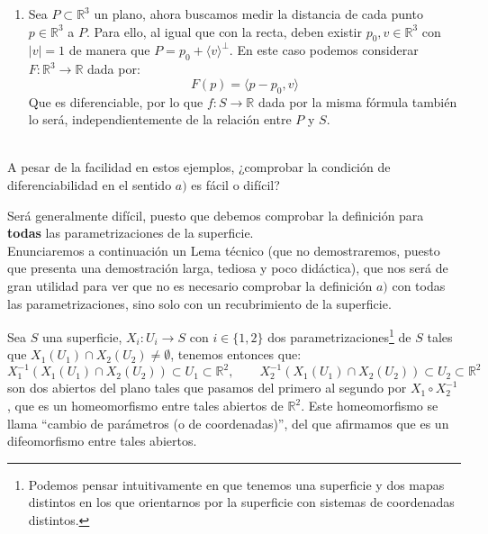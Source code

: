 \begin{ejemplo}
\begin{enumerate}
\begin{enumerate}
            Por otra parte, vemos que la aplicación $F:\mathbb{R}^3\to\mathbb{R}$ dada por:
            \begin{equation*}
                F(p) = |p-p_0|^2 - \langle p-p_0,v \rangle^2
            \end{equation*}
            es diferenciable, por lo que también lo será $f:S\to\mathbb{R}$ dada por la misma fórmula, independientemente de la posición relativa de $R$ y $S$.
        \item Sea $P\subset \mathbb{R}^3$ un plano, ahora buscamos medir la distancia de cada punto $p\in \mathbb{R}^3$ a $P$. Para ello, al igual que con la recta, deben existir $p_0,v\in \mathbb{R}^3$ con $|v| = 1$ de manera que $P = p_0 + \langle v \rangle^\perp$. En este caso podemos considerar $F:\mathbb{R}^3\to\mathbb{R}$ dada por:
            \begin{equation*}
                F(p) = \langle p-p_0,v \rangle 
            \end{equation*}
            Que es diferenciable, por lo que $f:S\to\mathbb{R}$ dada por la misma fórmula también lo será, independientemente de la relación entre $P$ y $S$.
        \end{enumerate}
    \end{enumerate}
\end{ejemplo}~\\

\noindent
A pesar de la facilidad en estos ejemplos, ¿comprobar la condición de diferenciabilidad en el sentido $a)$ es fácil o difícil?

Será generalmente difícil, puesto que debemos comprobar la definición para \textbf{todas} las parametrizaciones de la superficie.\\

\noindent 
Enunciaremos a continuación un Lema técnico (que no demostraremos, puesto que presenta una demostración larga, tediosa y poco didáctica), que nos será de gran utilidad para ver que no es necesario comprobar la definición $a)$ con todas las parametrizaciones, sino solo con un recubrimiento de la superficie.

\begin{lema}\label{lema:tecnico}
    Sea $S$ una superficie, $X_i:U_i\to S$ con $i \in \{1,2\}$ dos parametrizaciones\footnote{Podemos pensar intuitivamente en que tenemos una superficie y dos mapas distintos en los que orientarnos por la superficie con sistemas de coordenadas distintos.} de $S$ tales que $X_1(U_1)\cap X_2(U_2) \neq \emptyset $, tenemos entonces que:
    \begin{equation*}
        X_1^{-1}(X_1(U_1)\cap X_2(U_2)) \subset U_1\subset \mathbb{R}^2, \qquad 
        X_2^{-1}(X_1(U_1)\cap X_2(U_2)) \subset U_2\subset \mathbb{R}^2
    \end{equation*}
    son dos abiertos del plano tales que pasamos del primero al segundo por $X_1\circ X_2^{-1}$, que es un homeomorfismo entre tales abiertos de $\mathbb{R}^2$. Este homeomorfismo se llama ``cambio de parámetros (o de coordenadas)'', del que afirmamos que es un difeomorfismo entre tales abiertos.
\end{lema}

